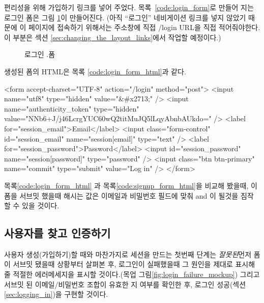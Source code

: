 \noindent 편리성을 위해 가입하기 링크를 넣어 주었다. 목록~\ref{code:login_form}로 만들어 지는 로그인 폼은 그림 \ref{fig:login_form}이 만들어진다. (아직 ``로그인'' 네비게이션 링크를 넣지 않았기 때문에 이 페이지에 접속하기 위해서는 주소창에 직접 /login URL을 직접 적어줘야한다. 이 부분은 섹션 \ref{sec:changing_the_layout_links}에서 작업할 예정이다.) 

\begin{figure} \begin{center}  \end{center} \caption{로그인 .폼\label{fig:login_form}} \end{figure} 

생성된 폼의 HTML은 목록 \ref{code:login_form_html}과 같다. 

\begin{codelisting} \label{code:login_form_html}  

\begin{code} <form accept-charset="UTF-8" action="/login" method="post"> <input name="utf8" type="hidden" value="&#x2713;" /> <input name="authenticity_token" type="hidden" value="NNb6+J/j46LcrgYUC60wQ2titMuJQ5lLqyAbnbAUkdo=" /> <label for="session_email">Email</label> <input class="form-control" id="session_email" name="session[email]" type="text" /> <label for="session_password">Password</label> <input id="session_password" name="session[password]" type="password" /> <input class="btn btn-primary" name="commit" type="submit" value="Log in" /> </form> \end{code} \end{codelisting} 

\noindent 목록\ref{code:login_form_html} 과 목록\ref{code:signup_form_html}을 비교해 봤을때, 이 폼을 서브밋 했을때  해시는 값은 이메일과 비밀번호 필드에 맞춰  and 이 될것을 짐작 할 수 있을 것이다. 

\subsection{사용자를 찾고 인증하기} \label{sec:finding_and_authenticating_a_user} 

사용자 생성(가입하기)할 때와 마찬가지로 세션을 만드는 첫번째 단계는 \emph{잘못된}먼저 폼이 서브밋 됐을때 상황부터 살펴본 후, 로그인이 실패했을때 그 원인을 제대로 표시해줄 적절한 에러메세지을 표시할 것이다.(목업 그림\ref{fig:login_failure_mockup}) 그리고 서브밋 된 이메일/비밀번호 조합이 유효한 지 여부를 확인한 후, 로그인 성공(섹션\ref{sec:logging_in})을 구현할 것이다.  

